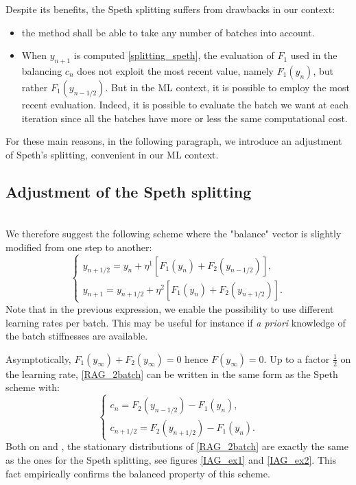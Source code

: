 \documentclass[article,authoryear,jmlmc]{beg_32}             %
\begin{document}
Despite its benefits, the Speth splitting suffers from drawbacks in our context:
\begin{itemize}
        \item the method shall be able to take any number of batches into account.
	\item When $y_{n+1}$ is computed \eqref{splitting_speth}, the evaluation of $F_1$ used in the balancing $c_n$ does not exploit the most recent value, namely $F_1(y_n)$, but rather $F_1(y_{n-1/2})$. But in the ML context, it is possible to employ the most recent evaluation. Indeed, it is possible to evaluate the batch we want at each iteration since all the batches have more or less the same computational cost. 
\end{itemize}
For these main reasons, in the following paragraph, we introduce an adjustment of Speth's splitting, convenient in our ML context. 

\subsection{Adjustment of the Speth splitting}
\label{extendedSpeth}
~~\\
We therefore suggest the following scheme where the "balance" vector is slightly modified from one step to another:
\begin{equation}
	\left\{
	\begin{array}{ll}
		y_{n+1/2} = y_n + \eta^1 \left[F_1(y_n)+F_2(y_{n-1/2})\right],\\
		y_{n+1} = y_{n+1/2} + \eta^2 \left[F_1(y_n)+F_2(y_{n+1/2})\right].
	\end{array}
	\right.
	\label{RAG_2batch}
\end{equation}
Note that in the previous expression, we enable the possibility to use different learning rates per batch. 
This may be useful for instance if {\em a priori} knowledge of the batch stiffnesses are available. 

Asymptotically, $F_1(y_{\infty})+F_2(y_{\infty})=0$ hence $F(y_{\infty})=0$.
Up to a factor $\frac{1}{2}$ on the learning rate, 
\eqref{RAG_2batch} can be written in the same form as the Speth scheme with:
\begin{equation*}
	\left\{
	\begin{array}{ll}
		c_n = F_2(y_{n-1/2})-F_1(y_n),\\
		c_{n+1/2} = F_2(y_{n+1/2})-F_1(y_n).
	\end{array}
	\right.
\end{equation*}
Both on \exOne and \exTwo, the stationary distributions of \eqref{RAG_2batch} are exactly the same as the ones for the Speth splitting, see figures \ref{IAG_ex1} and \ref{IAG_ex2}. This fact empirically confirms the balanced property of this scheme.
\end{document}
